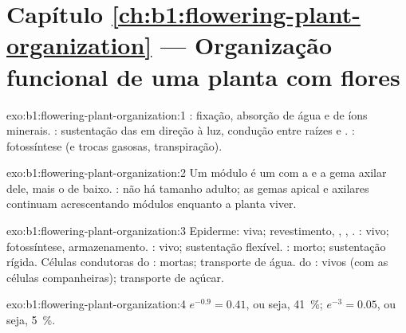 \section*{Capítulo \ref{ch:b1:flowering-plant-organization} --- Organização funcional de uma planta com flores}

\begin{solution}{exo:b1:flowering-plant-organization:1}
: fixação, absorção de água e de íons minerais. : sustentação
das  em direção à luz, condução entre raízes e . :
fotossíntese (e trocas gasosas, transpiração).
\end{solution}

\begin{solution}{exo:b1:flowering-plant-organization:2}
Um módulo é um  com a  e a gema axilar dele, mais o  de
baixo. : não há tamanho adulto; as gemas apical
e axilares continuam acrescentando módulos enquanto a planta viver.
\end{solution}

\begin{solution}{exo:b1:flowering-plant-organization:3}
Epiderme: viva; revestimento, , , .
: vivo; fotossíntese, armazenamento. : vivo;
sustentação flexível. : morto; sustentação rígida. Células
condutoras do : mortas; transporte de água.  do
: vivos (com as células companheiras); transporte de açúcar.
\end{solution}

\begin{solution}{exo:b1:flowering-plant-organization:4}
$e^{-0.9} = 0.41$, ou seja, \qty{41}{\%}; $e^{-3} = 0.05$, ou seja,
\qty{5}{\%}.
\end{solution}


